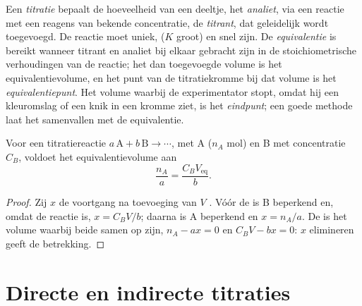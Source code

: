\begin{definition}\label{def:b1:titration-methods:titration}
Een \emph{titratie} bepaalt de hoeveelheid van een
deeltje, het \emph{analiet}, via een reactie met een
reagens van bekende concentratie, de \emph{titrant}, dat
geleidelijk wordt toegevoegd. De reactie moet uniek,  ($K$
groot) en snel zijn. De \emph{equivalentie} is bereikt
wanneer titrant en analiet bij elkaar gebracht zijn in de
stoichiometrische verhoudingen van de reactie; het dan toegevoegde volume
is het equivalentievolume, en het punt van de titratiekromme bij dat
volume is het
\emph{equivalentiepunt}. Het volume waarbij de
experimentator stopt, omdat hij een kleuromslag of een knik in een kromme
ziet, is het \emph{eindpunt}; een goede methode laat het
samenvallen met de equivalentie.
\end{definition}

\begin{proposition}[Equivalentiebetrekking]\label{prop:b1:titration-methods:equivalence}
Voor een titratiereactie $a\,\mathrm{A} + b\,\mathrm{B} \to \cdots$, met
 A ($n_A$ mol) en  B met concentratie $C_B$, voldoet het
equivalentievolume aan
\[
  \frac{n_A}{a} = \frac{C_B V_{\mathrm{eq}}}{b} .
\]
\end{proposition}

\begin{proof}
Zij $x$ de voortgang na toevoeging van $V$ . Vóór de 
is B beperkend en, omdat de reactie  is, $x = C_BV/b$;
daarna is A beperkend en $x = n_A/a$. De  is het volume
waarbij beide samen op zijn, $n_A - ax = 0$ en $C_BV - bx = 0$: $x$
elimineren geeft de betrekking.
\end{proof}

\section{Directe en indirecte titraties}

